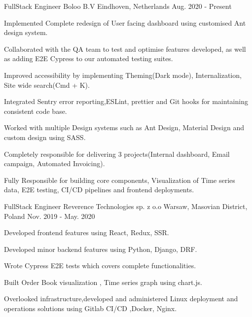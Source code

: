 \begin{cventries}

  \cventry
    {FullStack Engineer}
    {Boloo B.V}
    {Eindhoven, Netherlands}
    {Aug. 2020 - Present}
    {
      \begin{cvitems}
        \item {Implemented Complete redesign of User facing dashboard using customised Ant design system.}
        \item {Collaborated with the QA team to test and optimise features developed, as well as adding E2E Cypress to our automated testing suites.}
        \item {Improved accessibility by implementing Theming(Dark mode), Internalization, Site wide search(Cmd + K).}
        \item {Integrated Sentry error reporting,ESLint, prettier and Git hooks for maintaining consistent code base.}
        \item {Worked with multiple Design systems such as Ant Design, Material Design and custom design using SASS.}
        \item {Completely responsible for delivering 3 projects(Internal dashboard, Email campaign, Automated Invoicing).}
        \item {Fully Responsible for building core components, Visualization of Time series data, E2E testing, CI/CD pipelines and frontend deployments.}
      \end{cvitems}
    }

  \cventry
    {FullStack Engineer}
    {Reverence Technologies sp. z o.o}
    {Warsaw, Masovian District, Poland}
    {Nov. 2019 - May. 2020}
    {
      \begin{cvitems}
        \item { Developed frontend features using React, Redux, SSR.}
        \item { Developed minor backend features using Python, Django, DRF.}
        \item { Wrote Cypress E2E tests which covers complete functionalities.}
        \item { Built Order Book visualization , Time series graph using chart.js.}
        \item { Overlooked infrastructure,developed and administered Linux deployment and
        operations solutions using Gitlab CI/CD ,Docker, Nginx.}
        \end{cvitems}
    }


\end{cventries}
